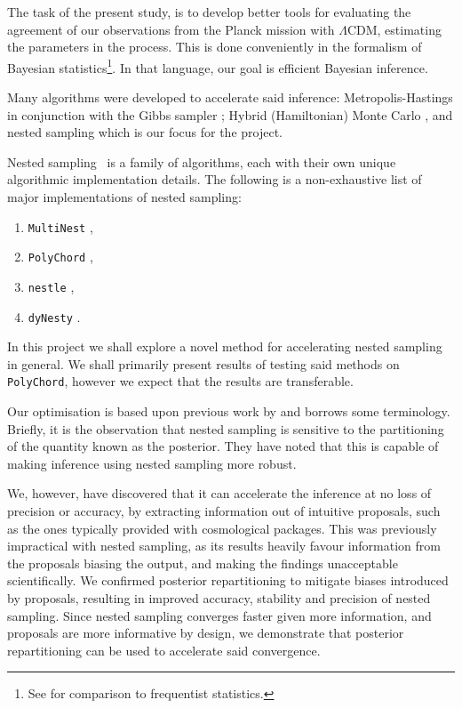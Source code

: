 \documentclass[usenatbib]{mnras}
\begin{document}
The task of the present study, is to develop better tools for
evaluating the agreement of our observations from the Planck mission
with \(\Lambda\)CDM, estimating the parameters in the process.  This
is done conveniently in the formalism of Bayesian
statistics\footnote{See \cite{xkcd} for comparison to frequentist
  statistics.}. In that language, our goal is efficient Bayesian
inference.

Many algorithms were developed to accelerate said inference:
Metropolis-Hastings \citep{Metropolis} in conjunction with the Gibbs
sampler \citep{Metropolis-Hastings-Gibbs}; Hybrid (Hamiltonian) Monte
Carlo \citep{1701.02434,Duane_1987}, and nested sampling
\citep{Skilling2006} which is our focus for the project.

Nested sampling~\citep{Skilling2006} is a family of algorithms, each
with their own unique algorithmic implementation details. The
following is a non-exhaustive list of major implementations of nested
sampling:
\begin{enumerate}
\item \texttt{MultiNest} \citep{Feroz2009MultiNestAE},
\item \texttt{PolyChord} \citep{polychord},
\item \texttt{nestle} \citep{nestle},
\item \texttt{dyNesty} \citep{Speagle_2020}.
\end{enumerate}
In this project we shall explore a novel method for accelerating
nested sampling in general. We shall primarily present results of
testing said methods on \texttt{PolyChord}, however we expect that the
results are transferable.

Our optimisation is based upon previous work by
\cite{chen-ferroz-hobson} and borrows some terminology. Briefly,
it is the observation that nested sampling is sensitive to the
partitioning of the quantity known as the posterior. They have noted
that this is capable of making inference using nested sampling more
robust.

We, however, have discovered that it can accelerate the inference at
no loss of precision or accuracy, by extracting information out of
intuitive proposals, such as the ones typically provided with
cosmological packages. This was previously impractical with nested
sampling, as its results heavily favour information from the proposals
biasing the output, and making the findings unacceptable
scientifically. We confirmed posterior repartitioning to mitigate
biases introduced by proposals, resulting in improved accuracy,
stability and precision of nested sampling. Since nested sampling
converges faster given more information, and proposals are more
informative by design, we demonstrate that posterior repartitioning
can be used to accelerate said convergence.
\end{document}
